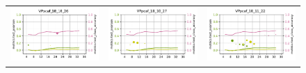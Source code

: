 \begin{figure}
\begin{tabular}{cc|c}
\includegraphics[width=\subplotwidth]{./figures/csp_spoc_incommon/bubble_csp_spoc_incommon_VPpcaf_d2_nolegend}& \includegraphics[width=\subplotwidth]{./figures/csp_spoc_incommon/bubble_csp_spoc_incommon_VPpcaf_d3_nolegend}& \includegraphics[width=\subplotwidth]{./figures/csp_spoc_incommon/bubble_csp_spoc_incommon_VPpcaf_d4_nolegend}\\

\end{tabular}
\end{figure}
